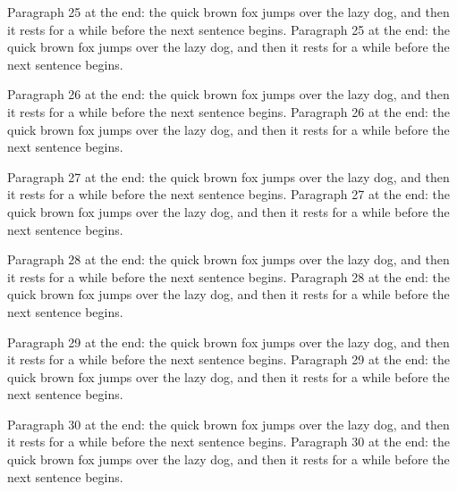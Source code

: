 \documentclass{article}
\begin{document}
Paragraph 25 at the end: the quick brown fox jumps over the lazy dog, and then it rests for a while before the next sentence begins. Paragraph 25 at the end: the quick brown fox jumps over the lazy dog, and then it rests for a while before the next sentence begins. 

Paragraph 26 at the end: the quick brown fox jumps over the lazy dog, and then it rests for a while before the next sentence begins. Paragraph 26 at the end: the quick brown fox jumps over the lazy dog, and then it rests for a while before the next sentence begins. 

Paragraph 27 at the end: the quick brown fox jumps over the lazy dog, and then it rests for a while before the next sentence begins. Paragraph 27 at the end: the quick brown fox jumps over the lazy dog, and then it rests for a while before the next sentence begins. 

Paragraph 28 at the end: the quick brown fox jumps over the lazy dog, and then it rests for a while before the next sentence begins. Paragraph 28 at the end: the quick brown fox jumps over the lazy dog, and then it rests for a while before the next sentence begins. 

Paragraph 29 at the end: the quick brown fox jumps over the lazy dog, and then it rests for a while before the next sentence begins. Paragraph 29 at the end: the quick brown fox jumps over the lazy dog, and then it rests for a while before the next sentence begins. 

Paragraph 30 at the end: the quick brown fox jumps over the lazy dog, and then it rests for a while before the next sentence begins. Paragraph 30 at the end: the quick brown fox jumps over the lazy dog, and then it rests for a while before the next sentence begins. 
\end{document}

